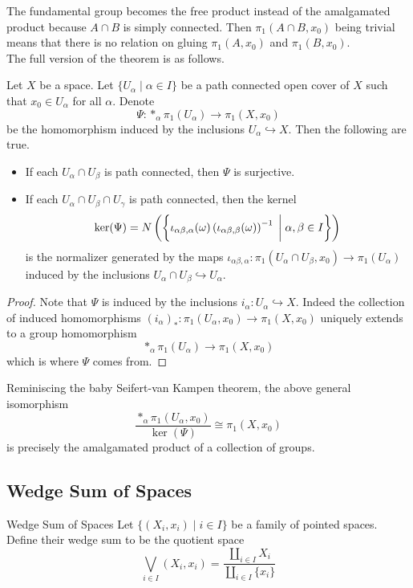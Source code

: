 \documentclass[a4paper]{article}
\begin{document}
The fundamental group becomes the free product instead of the amalgamated product because $A\cap B$ is simply connected. Then $\pi_1(A\cap B,x_0)$ being trivial means that there is no relation on gluing $\pi_1(A,x_0)$ and $\pi_1(B,x_0)$. \\

The full version of the theorem is as follows. 

\begin{thm}{}{} Let $X$ be a space. Let $\{U_\alpha\;|\;\alpha\in I\}$ be a path connected open cover of $X$ such that $x_0\in U_\alpha$ for all $\alpha$. Denote $$\Psi:\ast_\alpha\pi_1(U_\alpha)\to\pi_1(X,x_0)$$ be the homomorphism induced by the inclusions $U_\alpha\hookrightarrow X$. Then the following are true. 
\begin{itemize}
\item If each $U_\alpha\cap U_\beta$ is path connected, then $\Psi$ is surjective. 
\item If each $U_\alpha\cap U_\beta\cap U_\gamma$ is path connected, then the kernel $$\ker(\Psi)=N\left(\left\{\iota_{\alpha\beta,\alpha}(\omega)\left(\iota_{\alpha\beta,\beta}(\omega)\right)^{-1}\;\bigg{|}\;\alpha,\beta\in I\right\}\right)$$ is the normalizer generated by the maps $\iota_{\alpha\beta,\alpha}:\pi_1(U_\alpha\cap U_\beta,x_0)\to\pi_1(U_\alpha)$ induced by the inclusions $U_\alpha\cap U_\beta\hookrightarrow U_\alpha$. 
\end{itemize} 
\begin{proof}
Note that $\Psi$ is induced by the inclusions $i_\alpha:U_\alpha\hookrightarrow X$. Indeed the collection of induced homomorphisms $(i_\alpha)_\ast:\pi_1(U_\alpha,x_0)\to\pi_1(X,x_0)$ uniquely extends to a group homomorphism $$\ast_\alpha\pi_1(U_\alpha)\to\pi_1(X,x_0)$$ which is where $\Psi$ comes from. 
\end{proof}
\end{thm}

Reminiscing the baby Seifert-van Kampen theorem, the above general isomorphism $$\frac{\ast_\alpha\pi_1(U_\alpha,x_0)}{\ker(\Psi)}\cong\pi_1(X,x_0)$$ is precisely the amalgamated product of a collection of groups. 

\subsection{Wedge Sum of Spaces}
\begin{defn}{Wedge Sum of Spaces}{} Let $\{(X_i,x_i)\;|\;i\in I\}$ be a family of pointed spaces. Define their wedge sum to be the quotient space $$\bigvee_{i\in I}(X_i,x_i)=\frac{\coprod_{i\in I}X_i}{\coprod_{i\in I}\{x_i\}}$$
\end{defn}
\end{document}

